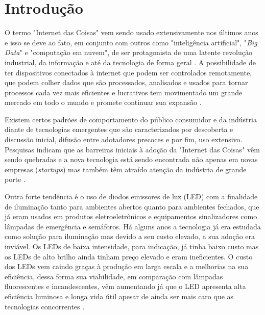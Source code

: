 \chapter{Introdução}

O termo "Internet das Coisas" \space vem sendo usado extensivamente nos últimos anos e isso se deve ao fato, em conjunto com outros como "inteligência artificial", "\textit{Big Data}" \space e "computação em nuvem", de ser protagonista de uma latente revolução industrial, da informação e até da tecnologia de forma geral \cite{iot-future}. A possibilidade de ter dispositivos conectados à internet que podem ser controlados remotamente, que podem colher dados que são processados, analisados e usados para tornar processos cada vez mais eficientes e lucrativos tem movimentado um grande mercado em todo o mundo e promete continuar sua expansão \cite{iot-future}. 

Existem certos padrões de comportamento do público consumidor e da indústria diante de  tecnologias emergentes que são caracterizados por descoberta e discussão inicial, difusão entre adotadores precoces e por fim, uso extensivo. Pesquisas indicam que as barreiras iniciais à adoção da "Internet das Coisas" \space vêm sendo quebradas e a nova tecnologia está sendo encontrada não apenas em novas empresas (\textit{startups}) mas também têm atraído atenção da indústria de grande porte \cite{forbes}. 

Outra forte tendência é o uso de diodos emissores de luz (LED) com a finalidade de iluminação tanto para ambientes abertos quanto para ambientes fechados, que já eram usados em produtos eletroeletrônicos e equipamentos sinalizadores como lâmpadas de emergência e semáforos. Há alguns anos a tecnologia já era estudada como solução para iluminação mas devido a seu custo elevado, a sua adoção era inviável. Os LEDs de baixa intensidade, para indicação, já tinha baixo custo mas os LEDs de alto brilho ainda tinham preço elevado e eram ineficientes. O custo dos LEDs vem caindo graças à produção em larga escala e a melhorias na sua eficiência, dessa forma sua viabilidade, em comparação com lâmpadas fluorescentes e incandescentes, vêm aumentando já que o LED apresenta alta eficiência luminosa e longa vida útil apesar de ainda ser mais caro que as tecnologias concorrentes \cite{led-comp}.


